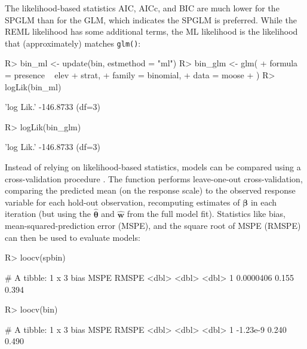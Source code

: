 \documentclass[
]{jss}
\begin{document}
The likelihood-based statistics AIC, AICc, and BIC are much lower for
the SPGLM than for the GLM, which indicates the SPGLM is preferred.
While the REML likelihood has some additional terms, the ML likelihood
is the likelihood that (approximately) matches \texttt{glm()}:

\begin{CodeChunk}
\begin{CodeInput}
R> bin_ml <- update(bin, estmethod = "ml")
R> bin_glm <- glm(
+    formula = presence ~ elev + strat,
+    family = binomial,
+    data = moose
+ )
R> logLik(bin_ml)
\end{CodeInput}
\begin{CodeOutput}
'log Lik.' -146.8733 (df=3)
\end{CodeOutput}
\begin{CodeInput}
R> logLik(bin_glm)
\end{CodeInput}
\begin{CodeOutput}
'log Lik.' -146.8733 (df=3)
\end{CodeOutput}
\end{CodeChunk}

Instead of relying on likelihood-based statistics, models can be
compared using a cross-validation procedure
\citep{james2013introduction}. The  function performs
leave-one-out cross-validation, comparing the predicted mean (on the
response scale) to the observed response variable for each hold-out
observation, recomputing estimates of \(\boldsymbol{\beta}\) in each
iteration (but using the \(\hat{\boldsymbol \theta}\) and
\(\hat{\mathbf{w}}\) from the full model fit). Statistics like bias,
mean-squared-prediction error (MSPE), and the square root of MSPE
(RMSPE) can then be used to evaluate models:

\begin{CodeChunk}
\begin{CodeInput}
R> loocv(spbin)
\end{CodeInput}
\begin{CodeOutput}
# A tibble: 1 x 3
       bias  MSPE RMSPE
      <dbl> <dbl> <dbl>
1 0.0000406 0.155 0.394
\end{CodeOutput}
\begin{CodeInput}
R> loocv(bin)
\end{CodeInput}
\begin{CodeOutput}
# A tibble: 1 x 3
      bias  MSPE RMSPE
     <dbl> <dbl> <dbl>
1 -1.23e-9 0.240 0.490
\end{CodeOutput}
\end{CodeChunk}
\end{document}
